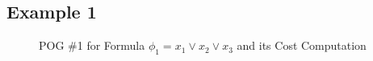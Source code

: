 \documentclass{llncs}
\begin{document}
\subsection{Example 1}

\begin{figure}
\caption{POG \#1 for Formula $\phi_1 = x_1 \lor x_2 \lor x_3$ and its Cost Computation}
\label{fig:c3:pog}
\end{figure}
\end{document}
